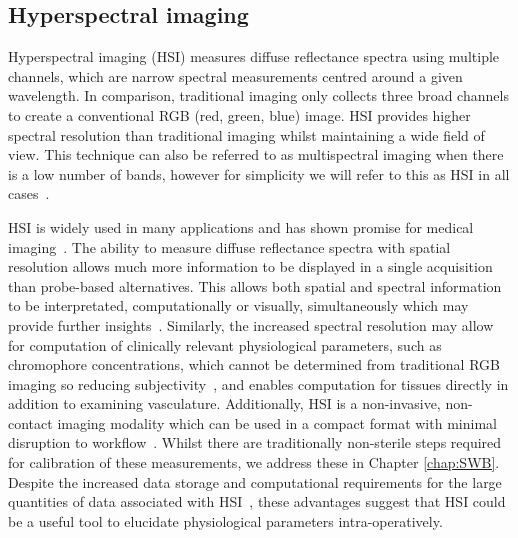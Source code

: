 \subsection{Hyperspectral imaging}\label{sec:introHSI}
Hyperspectral imaging (HSI) measures diffuse reflectance spectra using multiple channels, which are narrow spectral measurements centred around a given wavelength. In comparison, traditional imaging only collects three broad channels to create a conventional RGB (red, green, blue) image. HSI provides higher spectral resolution than traditional imaging whilst maintaining a wide field of view. This technique can also be referred to as multispectral imaging when there is a low number of bands, however for simplicity we will refer to this as HSI in all cases~\citep{Clancy2020}. 

HSI is widely used in many applications and has shown promise for medical imaging~\citep{Lu2014,Giannoni2018,Calin2014,Shapey2019}. The ability to measure diffuse reflectance spectra with spatial resolution allows much more information to be displayed in a single acquisition than probe-based alternatives. This allows both spatial and spectral information to be interpretated, computationally or visually, simultaneously which may provide further insights~\citep{Seidlitz2022}. Similarly, the increased spectral resolution may allow for computation of clinically relevant physiological parameters, such as chromophore concentrations, which cannot be determined from traditional RGB imaging so reducing subjectivity~\citep{Seidlitz2022}, and enables computation for tissues directly in addition to examining vasculature. Additionally, HSI is a non-invasive, non-contact imaging modality which can be used in a compact format with minimal disruption to workflow~\citep{Thoenissen2023, Ebner2021, MacCormac2023}. Whilst there are traditionally non-sterile steps required for calibration of these measurements, we address these in Chapter \ref{chap:SWB}. Despite the increased data storage and computational requirements for the large quantities of data associated with HSI~\citep{Altamimi2022}, these advantages suggest that HSI could be a useful tool to elucidate physiological parameters intra-operatively. 

